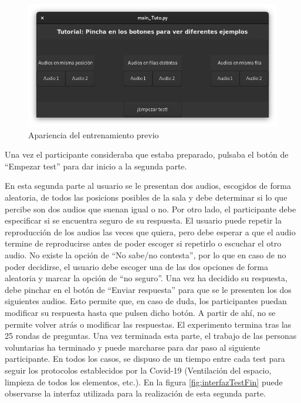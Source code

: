 \documentclass[11pt,a4paper]{book}
\begin{document}
                    \begin{figure}[H]
                        \includegraphics[scale=0.6]{../imagenes/interfaz_tutorial.png}
			            \centering
			            \caption{Apariencia del entrenamiento previo}
			            \label{fig:interfazTutorial}
                    \end{figure}
                
                    Una vez el participante consideraba que estaba preparado, pulsaba el botón de ``Empezar test'' para dar inicio a la segunda parte.
                
                    En esta segunda parte al usuario se le presentan dos audios, escogidos de forma aleatoria, de todos las posicions posibles de la sala y debe determinar si lo que percibe son dos audios que suenan igual o no. Por otro lado, el participante debe especificar si se encuentra seguro de su respuesta. El usuario puede repetir la reproducción de los audios las veces que quiera, pero debe esperar a que el audio termine de reproducirse antes de poder escoger si repetirlo o escuchar el otro audio. No existe la opción de ``No sabe/no contesta'', por lo que en caso de no poder decidirse, el usuario debe escoger una de las dos opciones de forma aleatoria y marcar la opción de ``no seguro''. Una vez ha decidido su respuesta, debe pinchar en el botón de ``Enviar respuesta'' para que se le presenten los dos siguientes audios. Esto permite que, en caso de duda, los participantes puedan modificar su respuesta hasta que pulsen dicho botón. A partir de ahí, no se permite volver atrás o modificar las respuestas. El experimento termina tras las 25 rondas de preguntas. Una vez terminada esta parte, el trabajo de las personas voluntarias ha terminado y puede marcharse para dar paso al siguiente participante. En todos los casos, se dispuso de un tiempo entre cada test para seguir los protocolos establecidos por la Covid-19 (Ventilación del espacio, limpieza de todos los elementos, etc.). En la figura \ref{fig:interfazTestFin} puede observarse la interfaz utilizada para la realización de esta segunda parte.
                
\end{document}
